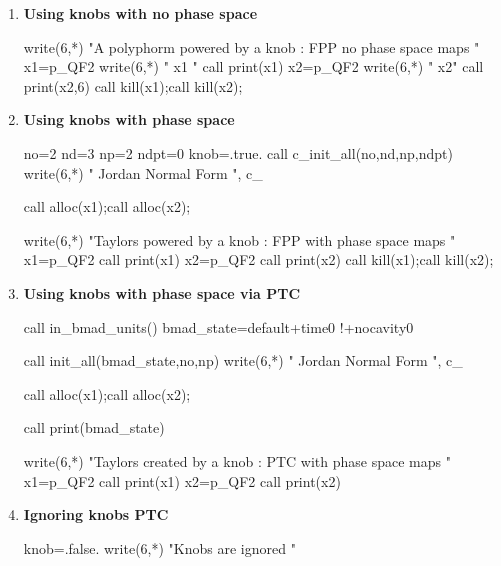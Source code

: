 \documentclass{hitec}     %
\begin{document}
{{{{{{{\begin{enumerate}
\begin{code}
write(6,*);write(6,*) "Printing knob 1  "
call print(p_QF1%
write(6,*);write(6,*) "Printing knob 2  "
call print(p_QF2%
  \end{code}
  
 \item\label{itc2} {\bf Using knobs with no phase space}
 
  \begin{code}
write(6,*) "A polyphorm powered by a knob : FPP no phase space maps "
x1=p_QF2%
write(6,*) " x1 "
call print(x1)
x2=p_QF2%
write(6,*) " x2"
call print(x2,6)
call kill(x1);call kill(x2);
  \end{code}
  
 \item\label{itc3} {\bf Using knobs with phase space}
 
  \begin{code}

no=2
nd=3
np=2
ndpt=0
knob=.true. 
call c_init_all(no,nd,np,ndpt)
write(6,*) " Jordan Normal Form ", c_%

call alloc(x1);call alloc(x2);

 

write(6,*) "Taylors powered by a knob : FPP with phase space maps "
x1=p_QF2%
call print(x1)
x2=p_QF2%
call print(x2)
call kill(x1);call kill(x2);
  \end{code}
  
 \item\label{itc4} {\bf Using knobs with phase space via PTC}
 
  \begin{code}
call in_bmad_units()
bmad_state=default+time0      !+nocavity0

call init_all(bmad_state,no,np)
write(6,*) " Jordan Normal Form ", c_%


call alloc(x1);call alloc(x2);

call print(bmad_state)
 

write(6,*) "Taylors created by a knob : PTC with phase space maps "
x1=p_QF2%
call print(x1)
x2=p_QF2%
call print(x2)
  \end{code}
  
 \item\label{itc5} {\bf Ignoring knobs PTC}
 
  \begin{code}
knob=.false.
write(6,*) "Knobs are ignored "


\end{code}
\end{enumerate}}}}}}}}
\end{document}
